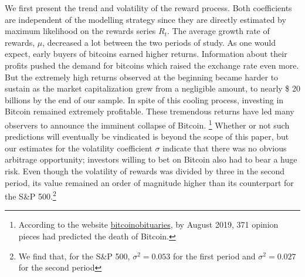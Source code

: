 \documentclass[12pt, a4paper]{article}
\begin{document}
We first present the trend and volatility of the reward process. Both
coefficients are independent of the modelling strategy
since they are directly estimated by maximum likelihood on the rewards series $R_t$.
The average growth rate of rewards, $\mu$, decreased a lot between the
two periods of study. As one would expect, early buyers of bitcoins earned
higher returns. Information about their profits pushed the demand for
bitcoins which raised the exchange rate even more. But the extremely high
returns observed at the beginning became harder to sustain as the market
capitalization grew from a negligible amount, to nearly \$ 20 billions by the
end of our sample. In spite of this cooling process, investing in Bitcoin
remained extremely profitable. These tremendous
returns have led many observers to announce the imminent collapse of Bitcoin.%
\footnote{%
According to the website \href{https://99bitcoins.com/bitcoinobituaries/}{%
bitcoinobituaries}, by August 2019,
371 opinion pieces had predicted the death of
Bitcoin.} Whether or not such predictions will eventually be vindicated is
beyond the scope of this paper, but our estimates for the volatility
coefficient $\sigma$ indicate that there was no obvious arbitrage
opportunity; investors willing to bet on Bitcoin also had to bear a huge
risk. Even though the volatility of rewards was divided by three in the
second period, its value remained an order of magnitude higher than its
counterpart for the S\&P 500.\footnote{%
We find that, for the S\&P 500, $\sigma^2=0.053$ for the first period and $%
\sigma^2=0.027$ for the second period}
\end{document}

